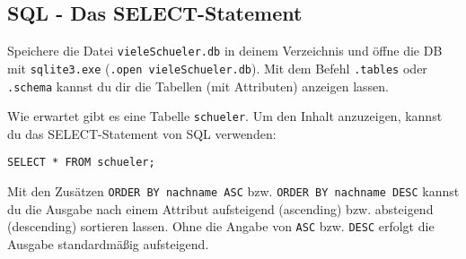 \subsection[SELECT-Statement]{SQL - Das SELECT-Statement}\label{select}
Speichere die Datei \texttt{vieleSchueler.db} in deinem Verzeichnis und öffne die DB mit \texttt{sqlite3.exe} (\lstinline!.open vieleSchueler.db!). Mit dem Befehl \lstinline!.tables! oder \lstinline!.schema! kannst du dir die Tabellen (mit Attributen) anzeigen lassen.

Wie erwartet gibt es eine Tabelle \lstinline!schueler!. Um den Inhalt anzuzeigen, kannst du das SELECT-Statement von SQL verwenden:
\begin{tcolorbox}[title=SELECT-Statement]
	\lstinline!SELECT * FROM schueler;!
\end{tcolorbox}
Mit den Zusätzen \lstinline!ORDER BY nachname ASC! bzw. \lstinline!ORDER BY nachname DESC!  kannst du die Ausgabe nach einem Attribut aufsteigend (ascending) bzw. absteigend (descending) sortieren lassen. Ohne die Angabe von \lstinline!ASC! bzw. \lstinline!DESC! erfolgt die Ausgabe standardmäßig aufsteigend.


